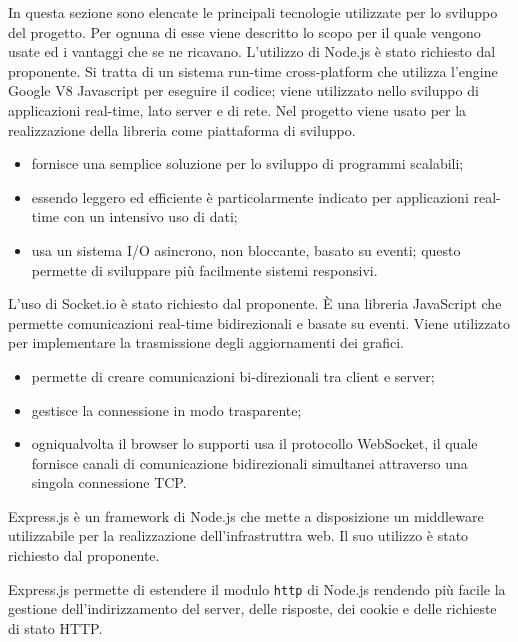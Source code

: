 In questa sezione sono elencate le principali tecnologie utilizzate per lo sviluppo del progetto. Per ognuna di esse viene descritto lo scopo per il quale vengono usate ed i vantaggi che se ne ricavano.
L'utilizzo di Node.js è stato richiesto dal proponente. Si tratta di un sistema run-time cross-platform che utilizza l'engine Google V8 Javascript per eseguire il codice; viene utilizzato nello sviluppo di applicazioni real-time, lato server e di rete. Nel progetto viene usato per la realizzazione della libreria come piattaforma di sviluppo.
\begin{itemize}
\item fornisce una semplice soluzione per lo sviluppo di programmi scalabili;
\item essendo leggero ed efficiente è particolarmente indicato per applicazioni real-time con un intensivo uso di dati;
\item usa un sistema I/O asincrono, non bloccante, basato su eventi; questo permette di sviluppare più facilmente sistemi responsivi.
\end{itemize}

L'uso di Socket.io è stato richiesto dal proponente. È una libreria JavaScript che permette comunicazioni real-time bidirezionali e basate su eventi. Viene utilizzato per implementare la trasmissione degli aggiornamenti dei grafici.
\begin{itemize}
\item permette di creare comunicazioni bi-direzionali tra client e server;
\item gestisce la connessione in modo trasparente;
\item ogniqualvolta il browser lo supporti usa il protocollo WebSocket, il quale fornisce canali di comunicazione bidirezionali simultanei attraverso una singola connessione TCP.
\end{itemize}

Express.js è un framework di Node.js che mette a disposizione un middleware utilizzabile per la realizzazione dell'infrastruttra web. Il suo utilizzo è stato richiesto dal proponente.

Express.js permette di estendere il modulo \texttt{http} di Node.js rendendo più facile la gestione dell'indirizzamento del server, delle risposte, dei cookie e delle richieste di stato HTTP.

